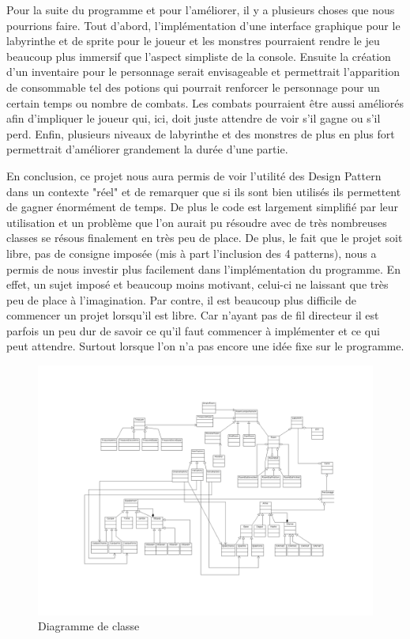\documentclass[a4paper]{article}
\begin{document}
Pour la suite du programme et pour l'améliorer, il y a plusieurs choses que nous pourrions faire.
Tout d'abord, l'implémentation d'une interface graphique pour le labyrinthe et de sprite pour le joueur et les monstres pourraient rendre le jeu beaucoup plus immersif que l'aspect simpliste de la console.
Ensuite la création d'un inventaire pour le personnage serait envisageable et permettrait l'apparition de consommable tel des potions qui pourrait renforcer le personnage pour un certain temps ou nombre de combats.
Les combats pourraient être aussi améliorés afin d'impliquer le joueur qui, ici, doit juste attendre de voir s’il gagne ou s’il perd.
Enfin, plusieurs niveaux de labyrinthe et des monstres de plus en plus fort permettrait d'améliorer grandement la durée d'une partie.

En conclusion, ce projet nous aura permis de voir l'utilité des Design Pattern dans un contexte "réel" et de remarquer que si ils sont bien utilisés ils permettent de gagner énormément de temps. De plus le code est largement simplifié par leur utilisation et un problème que l'on aurait pu résoudre avec de très nombreuses classes se résous finalement en très peu de place.
De plus, le fait que le projet soit libre, pas de consigne imposée (mis à part l’inclusion des 4 patterns), nous a permis de nous investir plus facilement dans l'implémentation du programme.
En effet, un sujet imposé et beaucoup moins motivant, celui-ci ne laissant que très peu de place à l'imagination.
Par contre, il est beaucoup plus difficile de commencer un projet lorsqu'il est libre. Car n'ayant pas de fil directeur il est parfois un peu dur de savoir ce qu'il faut commencer à implémenter et ce qui peut attendre. Surtout lorsque l’on n’a pas encore une idée fixe sur le programme.
\newpage
\begin{figure}[h]
        \centering
        \includegraphics[angle=90,width=20cm]{./diagClasse.png}
        \caption{\label{fig:diagClasse}Diagramme de classe}
      \end{figure}
\end{document}
